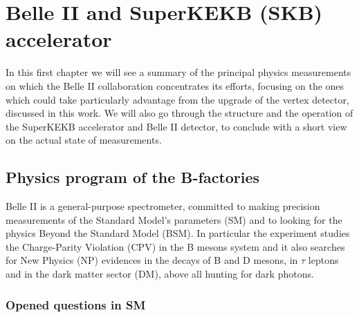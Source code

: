 
\chapter{Belle II and SuperKEKB (SKB) accelerator}

\begin{comment}
In this first chapter we will see a summary of the principal physics measurements conducted (?? taken) by Belle II experiment, focusing on the ones which could take particularly advantage from the upgrade of the vertex detector, discussed in this work. We will also go through the structure and the operation of the SuperKEKB accelerator and Belle II detector, to conclude (end) with a short view on the actual state of measurements.
\end{comment}

In this first chapter we will see a summary of the principal physics measurements on which the Belle II collaboration concentrates its efforts, focusing on the ones which could take particularly advantage from the upgrade of the vertex detector, discussed in this work. We will also go through the structure and the operation of the SuperKEKB accelerator and Belle II detector, to conclude with a short view on the actual state of measurements.




\section{Physics program of the B-factories}



Belle II is a general-purpose spectrometer, committed to making precision measurements of the Standard Model's parameters (SM) and to looking for the physics Beyond the Standard Model (BSM).
In particular the experiment studies the Charge-Parity Violation (CPV) in the B mesons system and it also searches for New Physics (NP) evidences in the decays of B and D mesons, in $\tau$ leptons and in the dark matter sector (DM), above all hunting for dark photons.

\subsection{Opened questions in SM}

